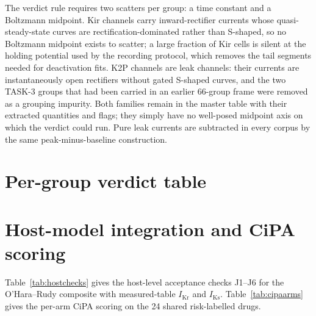 \documentclass[11pt,a4paper]{article}
\begin{document}
The verdict rule requires two scatters per group: a time constant and a
Boltzmann midpoint. Kir channels carry inward-rectifier currents whose
quasi-steady-state curves are rectification-dominated rather than S-shaped, so
no Boltzmann midpoint exists to scatter; a large fraction of Kir cells is
silent at the holding potential used by the recording protocol, which removes
the tail segments needed for deactivation fits. K2P channels are leak
channels: their currents are instantaneously open rectifiers without gated
S-shaped curves, and the two TASK-3 groups that had been carried in an earlier
66-group frame were removed as a grouping impurity. Both families remain in
the master table with their extracted quantities and flags; they simply have
no well-posed midpoint axis on which the verdict could run. Pure leak currents
are subtracted in every corpus by the same peak-minus-baseline construction.

\FloatBarrier
\section{Per-group verdict table}



\FloatBarrier
\section{Host-model integration and CiPA scoring}

Table~\ref{tab:hostchecks} gives the host-level acceptance checks J1--J6 for
the O'Hara--Rudy composite with measured-table $I_{\mathrm{Kr}}$ and
$I_{\mathrm{Ks}}$. Table~\ref{tab:cipaarms} gives the per-arm CiPA scoring on
the 24 shared risk-labelled drugs.
\end{document}
